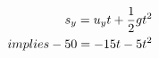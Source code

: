 \documentclass[preview]{standalone}
\begin{document}
\begin{align*}
\special{dvisvgm:raw <g id='unique000'>}s_y = u_y t + \frac{1}{2} g t^2 \\implies -50 = -15t - 5t^2\special{dvisvgm:raw </g>}
\end{align*}
\end{document}
